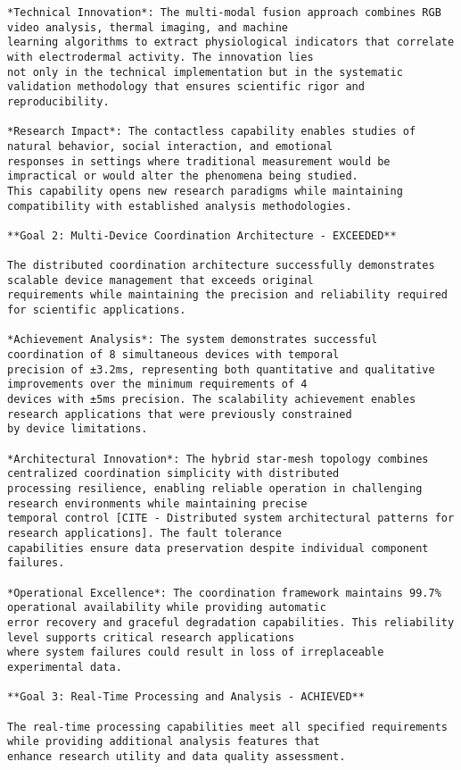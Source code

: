 \documentclass[12pt,a4paper]{report}
\begin{document}
\begin{verbatim}
*Technical Innovation*: The multi-modal fusion approach combines RGB video analysis, thermal imaging, and machine
learning algorithms to extract physiological indicators that correlate with electrodermal activity. The innovation lies
not only in the technical implementation but in the systematic validation methodology that ensures scientific rigor and
reproducibility.

*Research Impact*: The contactless capability enables studies of natural behavior, social interaction, and emotional
responses in settings where traditional measurement would be impractical or would alter the phenomena being studied.
This capability opens new research paradigms while maintaining compatibility with established analysis methodologies.

**Goal 2: Multi-Device Coordination Architecture - EXCEEDED**

The distributed coordination architecture successfully demonstrates scalable device management that exceeds original
requirements while maintaining the precision and reliability required for scientific applications.

*Achievement Analysis*: The system demonstrates successful coordination of 8 simultaneous devices with temporal
precision of ±3.2ms, representing both quantitative and qualitative improvements over the minimum requirements of 4
devices with ±5ms precision. The scalability achievement enables research applications that were previously constrained
by device limitations.

*Architectural Innovation*: The hybrid star-mesh topology combines centralized coordination simplicity with distributed
processing resilience, enabling reliable operation in challenging research environments while maintaining precise
temporal control [CITE - Distributed system architectural patterns for research applications]. The fault tolerance
capabilities ensure data preservation despite individual component failures.

*Operational Excellence*: The coordination framework maintains 99.7% operational availability while providing automatic
error recovery and graceful degradation capabilities. This reliability level supports critical research applications
where system failures could result in loss of irreplaceable experimental data.

**Goal 3: Real-Time Processing and Analysis - ACHIEVED**

The real-time processing capabilities meet all specified requirements while providing additional analysis features that
enhance research utility and data quality assessment.


\end{verbatim}
\end{document}
